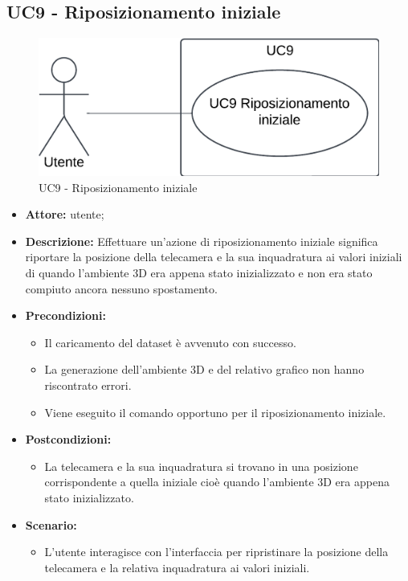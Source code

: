 \subsection{UC9 - Riposizionamento iniziale}
\begin{figure}[h!]\centering
    \includegraphics[scale=0.7]{template/images/UC9.png}
    \caption{UC9 - Riposizionamento iniziale}
\end{figure}
\begin{itemize}    
    \item \textbf{Attore:} utente;
    \item \textbf{Descrizione:} Effettuare un'azione di riposizionamento iniziale significa riportare la posizione della telecamera e la sua inquadratura ai valori iniziali di quando l'ambiente 3D 
    era appena stato inizializzato e non era stato compiuto ancora nessuno spostamento.
    \item \textbf{Precondizioni:}    
        \begin{itemize}
            \item Il caricamento del dataset è avvenuto con successo.
            \item La generazione dell'ambiente 3D e del relativo grafico non hanno riscontrato errori.
            \item Viene eseguito il comando opportuno per il riposizionamento iniziale.
        \end{itemize}    
    \item \textbf{Postcondizioni:}
        \begin{itemize}
            \item La telecamera e la sua inquadratura si trovano in una posizione corrispondente a quella iniziale cioè quando l'ambiente 3D era appena stato inizializzato.
        \end{itemize}    
    \item \textbf{Scenario:} 
        \begin{itemize}
            \item L'utente interagisce con l'interfaccia per ripristinare la posizione della telecamera e la relativa inquadratura ai valori iniziali.
        \end{itemize}
\end{itemize}

